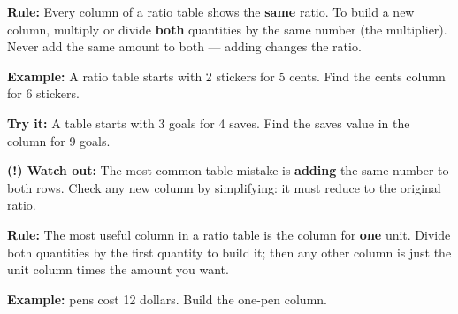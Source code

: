 \documentclass[12pt]{article}
\begin{document}


\begin{formulabox}
\textbf{Rule:} Every column of a ratio table shows the \textbf{same} ratio. To
build a new column, multiply or divide \textbf{both} quantities by the same
number (the multiplier). Never add the same amount to both — adding changes the
ratio.
\end{formulabox}

\begin{examplebox}
\textbf{Example:} \quad A ratio table starts with 2 stickers for 5 cents. Find
the cents column for 6 stickers.
\end{examplebox}

\begin{tryitbox}
\textbf{Try it:} \quad A table starts with 3 goals for 4 saves. Find the saves
value in the column for 9 goals.\\[2pt]
\end{tryitbox}

\begin{watchoutbox}
\textbf{(!) Watch out:} The most common table mistake is \textbf{adding} the
same number to both rows. Check any new column by simplifying: it must reduce to
the original ratio.
\end{watchoutbox}


\begin{formulabox}
\textbf{Rule:} The most useful column in a ratio table is the column for
\textbf{one} unit. Divide both quantities by the first quantity to build it;
then any other column is just the unit column times the amount you want.
\end{formulabox}

\begin{examplebox}
\textbf{Example:}  pens cost 12 dollars. Build the one-pen column.
\end{examplebox}
\end{document}
